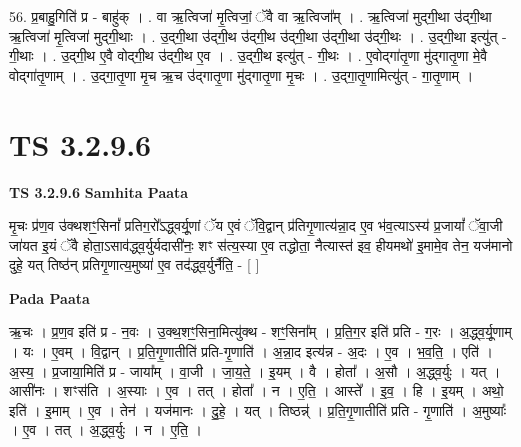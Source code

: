 \documentclass[17pt]{extarticle}
\begin{document}
56. प्र॒बाहु॒गिति॑ प्र - बाहु॑क् । . वा ऋ॒त्विजा॑ मृ॒त्विजां॒ ॅवै वा ऋ॒त्विजा᳚म् । . ऋ॒त्विजा॑ मुद्‍गी॒था उ॑द्‍गी॒था ऋ॒त्विजा॑ मृ॒त्विजा॑ मुद्‍गी॒थाः । . उ॒द्‍गी॒था उ॑द्‍गी॒थ उ॑द्‍गी॒थ उ॑द्‍गी॒था उ॑द्‍गी॒था उ॑द्‍गी॒थः । . उ॒द्‍गी॒था इत्यु॑त् - गी॒थाः । . उ॒द्‍गी॒थ ए॒वै वोद्‍गी॒थ उ॑द्‍गी॒थ ए॒व । . उ॒द्‍गी॒थ इत्यु॑त् - गी॒थः । . ए॒वोद्‍गा॑तृ॒णा मु॑द्‍गातृ॒णा मे॒वै वोद्‍गा॑तृ॒णाम् । . उ॒द्‍गा॒तृ॒णा मृ॒च ऋ॒च उ॑द्‍गातृ॒णा मु॑द्‍गातृ॒णा मृ॒चः । . उ॒द्‍गा॒तृ॒णामित्यु॑त् - गा॒तृ॒णाम् । \newline


\section{ TS 3.2.9.6 }

\textbf{TS 3.2.9.6 } \newline
\textbf{Samhita Paata} \newline

मृ॒चः प्र॑ण॒व उ॑क्थशꣳ॒॒सिनां᳚ प्रतिग॒रो᳚ऽद्ध्वर्यू॒णां ॅय ए॒वं ॅवि॒द्वान् प्र॑तिगृ॒णात्य॑न्ना॒द ए॒व भ॑व॒त्याऽस्य॑ प्र॒जायां᳚ ॅवा॒जी जा॑यत इ॒यं ॅवै होता॒ऽसाव॑द्ध्व॒र्युर्यदासी॑नः॒ शꣳ स॑त्य॒स्या ए॒व तद्धोता॒ नैत्यास्त॑ इव॒ हीयमथो॑ इ॒मामे॒व तेन॒ यज॑मानो दुहे॒ यत् तिष्ठ॑न् प्रतिगृ॒णात्य॒मुष्या॑ ए॒व तद॑द्ध्व॒र्युर्नैति॒ - [  ] \newline

\textbf{Pada Paata} \newline

ऋ॒चः । प्र॒ण॒व इति॑ प्र - न॒वः । उ॒क्थ॒शꣳ॒॒सिना॒मित्यु॑क्थ - शꣳ॒॒सिना᳚म् । प्र॒ति॒ग॒र इति॑ प्रति - ग॒रः । अ॒द्ध्व॒र्यू॒णाम् । यः । ए॒वम् । वि॒द्वान् । प्र॒ति॒गृ॒णातीति॑ प्रति-गृ॒णाति॑ । अ॒न्ना॒द इत्य॑न्न - अ॒दः । ए॒व । भ॒व॒ति॒ । एति॑ । अ॒स्य॒ । प्र॒जाया॒मिति॑ प्र - जाया᳚म् । वा॒जी । जा॒य॒ते॒ । इ॒यम् । वै । होता᳚ । अ॒सौ । अ॒द्ध्व॒र्युः । यत् । आसी॑नः । शꣳस॑ति । अ॒स्याः । ए॒व । तत् । होता᳚ । न । ए॒ति॒ । आस्ते᳚ । इ॒व॒ । हि । इ॒यम् । अथो॒ इति॑ । इ॒माम् । ए॒व । तेन॑ । यज॑मानः । दु॒हे॒ । यत् । तिष्ठन्न्॑ । प्र॒ति॒गृ॒णातीति॑ प्रति - गृ॒णाति॑ । अ॒मुष्याः᳚ । ए॒व । तत् । अ॒द्ध्व॒र्युः । न । ए॒ति॒ ।  \newline
\end{document}
